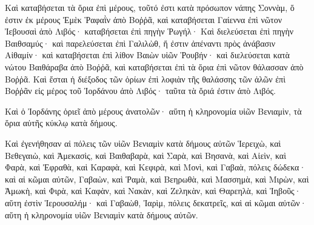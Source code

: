 {Καὶ καταβήσεται τὰ ὅρια ἐπὶ μέρους, τοῦτό ἐστι κατὰ πρόσωπον νάπης Σοννὰμ, ὅ ἐστιν ἐκ μέρους Ἐμὲκ Ῥαφαῒν ἀπὸ Βοῤῥᾶ, καὶ καταβήσεται Γαίεννα ἐπὶ νῶτον Ἰεβουσαὶ ἀπὸ Λιβός· καταβήσεται ἐπὶ πηγὴν Ῥωγήλ·
Καὶ διελεύσεται ἐπὶ πηγὴν Βαιθσαμύς· καὶ παρελεύσεται ἐπὶ Γαλιλὼθ, ἥ ἐστιν ἀπέναντι πρὸς ἀνάβασιν Αἰθαμίν· καὶ καταβήσεται ἐπὶ λίθον Βαιὼν υἱῶν Ῥουβήν·
καὶ διελεύσεται κατὰ νώτου Βαιθάραβα ἀπὸ Βοῤῥᾶ, καὶ καταβήσεται ἐπὶ τὰ ὅρια ἐπὶ νῶτον θάλασσαν ἀπὸ Βοῤῥᾶ.
Καὶ ἔσται ἡ διέξοδος τῶν ὁρίων ἐπὶ λοφιὰν τῆς θαλάσσης τῶν ἁλῶν ἐπὶ Βοῤῥᾶν εἰς μέρος τοῦ Ἰορδάνου ἀπὸ Λιβός· ταῦτα τὰ ὅριά ἐστιν ἀπὸ Λιβός.
\par }{\PP {}Καὶ ὁ Ἰορδάνης ὁριεῖ ἀπὸ μέρους ἀνατολῶν· αὕτη ἡ κληρονομία υἱῶν Βενιαμὶν, τὰ ὅρια αὐτῆς κύκλῳ κατὰ δήμους.
\par }{\PP {}Καὶ ἐγενήθησαν αἱ πόλεις τῶν υἱῶν Βενιαμὶν κατὰ δήμους αὐτῶν Ἱερειχὼ, καὶ Βεθεγαιὼ, καὶ Ἀμεκασὶς,
καὶ Βαιθαβαρὰ, καὶ Σαρὰ, καὶ Βησανὰ,
καὶ Αἰεὶν, καὶ Φαρὰ, καὶ Ἐφραθὰ,
καὶ Καραφὰ, καὶ Κεφιρὰ, καὶ Μονὶ, καὶ Γαβαὰ, πόλεις δώδεκα· καὶ αἱ κῶμαι αὐτῶν,
Γαβαὼν, καὶ Ῥαμὰ, καὶ Βεηρωθὰ,
καὶ Μασσημὰ, καὶ Μιρὼν, καὶ Ἀμωκὴ,
καὶ Φιρὰ, καὶ Καφὰν, καὶ Νακὰν, καὶ Ζεληκὰν, καὶ Θαρεηλὰ,
καὶ Ἰηβοῦς· αὕτη ἐστὶν Ἱερουσαλήμ· καὶ Γαβαὼθ, Ἰαρὶμ, πόλεις δεκατρεῖς, καὶ αἱ κῶμαι αὐτῶν· αὕτη ἡ κληρονομία υἱῶν Βενιαμὶν κατὰ δήμους αὐτῶν.

}
